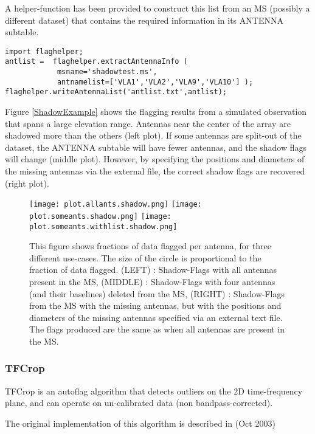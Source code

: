 A helper-function has been provided to construct this list from an MS (possibly a different dataset)
that contains the required information in its ANTENNA subtable.

\begin{verbatim}
import flaghelper;
antlist =  flaghelper.extractAntennaInfo (
            msname='shadowtest.ms',
            antnamelist=['VLA1','VLA2','VLA9','VLA10'] );
flaghelper.writeAntennaList('antlist.txt',antlist);
\end{verbatim}


Figure \ref{ShadowExample} shows the flagging results from a simulated observation that spans a large
elevation range. Antennas near the center of the array are shadowed more than the others (left plot). 
If some antennas are split-out of the dataset, the ANTENNA subtable will have fewer antennas, and the shadow
flags will change (middle plot).  However, by specifying the positions and diameters of the missing antennas
via the external file, the correct shadow flags are recovered (right plot). 

\begin{figure}
\texttt{[image: plot.allants.shadow.png]}
\texttt{[image: plot.someants.shadow.png]}
\texttt{[image: plot.someants.withlist.shadow.png]}
\caption{This figure shows  fractions of data flagged per antenna, for
three different use-cases. The size of the circle is proportional to the fraction of data flagged.
(LEFT) : Shadow-Flags with all antennas present in the MS,   (MIDDLE) : Shadow-Flags with four antennas (and their baselines) deleted from the MS,    (RIGHT) : Shadow-Flags from the MS with the missing antennas, but with the positions and diameters of the missing antennas specified via an external text file. The flags produced are the same as when all antennas are present in the MS.}
\label{Fig:ShadowExample}
\end{figure}


\subsubsection{TFCrop}

TFCrop is an autoflag algorithm that detects outliers on the 2D time-frequency plane, and 
 can operate on un-calibrated data (non bandpass-corrected).

The original implementation of this algorithm is described in 
 (Oct 2003)



